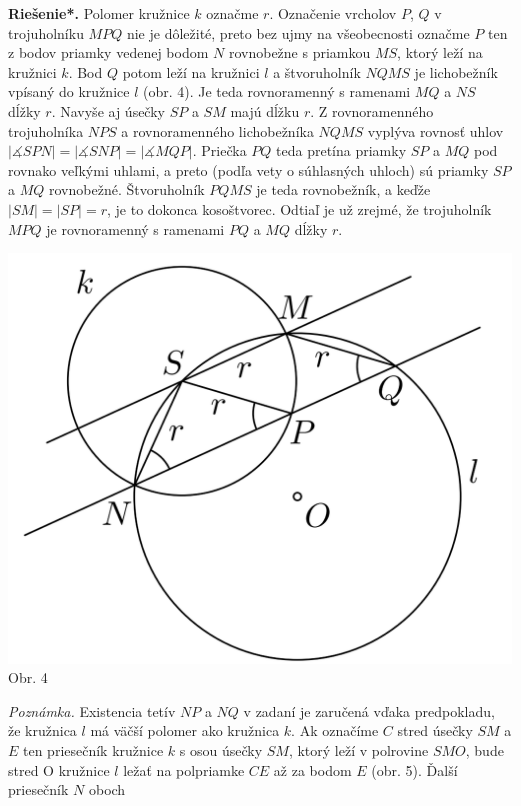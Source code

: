\documentclass[11pt,a4paper,oneside,final]{book}
\newcommand{\rieh}{\textbf{Riešenie*.} }
\newcommand{\ma}{\measuredangle}
\begin{document}
\rieh Polomer kružnice $k$ označme $r$. Označenie vrcholov $P$, $Q$ v trojuholníku $MPQ$ nie je dôležité, preto bez ujmy na všeobecnosti označme $P$ ten z bodov priamky vedenej bodom $N$ rovnobežne s priamkou $MS$, ktorý leží na kružnici $k$. Bod $Q$ potom leží na kružnici $l$ a štvoruholník $NQMS$ je lichobežník vpísaný do kružnice $l$ (obr. 4). Je teda rovnoramenný s ramenami $MQ$ a $NS$ dĺžky $r$. Navyše aj úsečky $SP$ a $SM$ majú dĺžku $r$. Z rovnoramenného trojuholníka $NPS$ a rovnoramenného lichobežníka $NQMS$ vyplýva rovnosť uhlov $|\ma SPN| = |\ma SNP| = |\ma MQP|$. Priečka $PQ$ teda pretína priamky $SP$ a $MQ$ pod rovnako veľkými uhlami, a preto (podľa vety o súhlasných uhloch) sú priamky $SP$ a $MQ$ rovnobežné. Štvoruholník $PQMS$ je teda rovnobežník, a keďže $|SM| = |SP| = r$, je to dokonca kosoštvorec. Odtiaľ je už zrejmé, že trojuholník $MPQ$ je rovnoramenný s ramenami $PQ$ a $MQ$ dĺžky $r$.
\begin{center}
\includegraphics[scale=0.3]{59K31}\\

Obr. 4
\end{center}
\textit{Poznámka.} Existencia tetív $NP$ a $NQ$ v zadaní je zaručená vďaka predpokladu, že kružnica $l$ má väčší polomer ako kružnica $k$. Ak označíme $C$ stred úsečky $SM$ a $E$ ten priesečník kružnice $k$ s osou úsečky $SM$, ktorý leží v polrovine $SMO$, bude stred O kružnice $l$ ležať na polpriamke $CE$ až za bodom $E$ (obr. 5). Ďalší priesečník $N$ oboch
\end{document}

